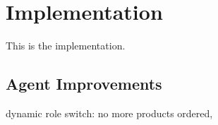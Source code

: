 \chapter{Implementation}

This is the implementation.

\section{Agent Improvements}
dynamic role switch: no more products ordered, \cite{dynamic_role_assignment}
